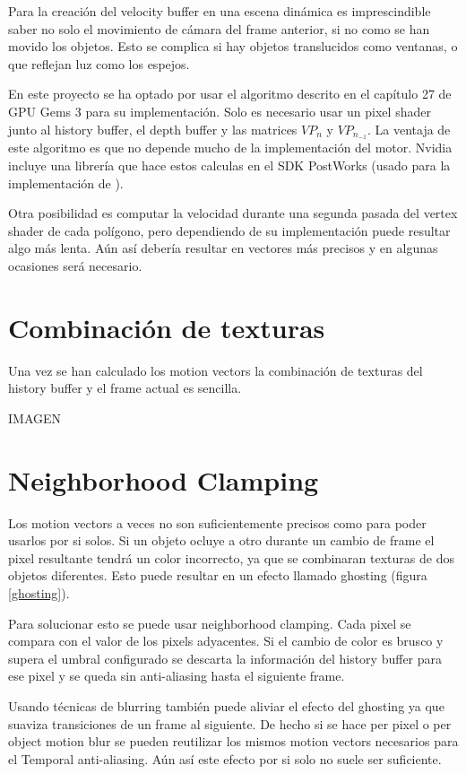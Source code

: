\documentclass[withindex, glossary]{cam-thesis}
\begin{document}
Para la creación del velocity buffer en una escena dinámica es imprescindible saber no solo el movimiento de cámara del frame anterior, si no como se han movido los objetos. Esto se complica si hay objetos translucidos como ventanas, o que reflejan luz como los espejos\cite{uncharted4}.

En este proyecto se ha optado por usar el algoritmo descrito en el capítulo 27 de GPU Gems 3\cite{Nguyen:2007:GG:1407436} para su implementación. Solo es necesario usar un pixel shader junto al history buffer, el depth buffer y las matrices $VP_{n}$ y $VP_{n_{-1}}$. La ventaja de este algoritmo es que no depende mucho de la implementación del motor. Nvidia incluye una librería que hace estos calculas en el SDK PostWorks\cite{postworks} (usado para la implementación de ).

Otra posibilidad es computar la velocidad durante una segunda pasada del vertex shader de cada polígono, pero dependiendo de su implementación puede resultar algo más lenta. Aún así debería resultar en vectores más precisos y en algunas ocasiones será necesario\cite{asscreed}.

\section{Combinación de texturas}

Una vez se han calculado los motion vectors la combinación de texturas del history buffer y el frame actual es sencilla.

IMAGEN

\section{Neighborhood Clamping}

Los motion vectors a veces no son suficientemente precisos como para poder usarlos por si solos. Si un objeto ocluye a otro durante un cambio de frame el pixel resultante tendrá un color incorrecto, ya que se combinaran texturas de dos objetos diferentes. Esto puede resultar en un efecto llamado ghosting (figura \ref{ghosting}).

Para solucionar esto se puede usar neighborhood clamping. Cada pixel se compara con el valor de los pixels adyacentes. Si el cambio de color es brusco y supera el umbral configurado se descarta la información del history buffer para ese pixel y se queda sin anti-aliasing hasta el siguiente frame.

Usando técnicas de blurring también puede aliviar el efecto del ghosting ya que suaviza transiciones de un frame al siguiente. De hecho si se hace per pixel o per object motion blur se pueden reutilizar los mismos motion vectors necesarios para el Temporal anti-aliasing. Aún así este efecto por si solo no suele ser suficiente.
\end{document}
